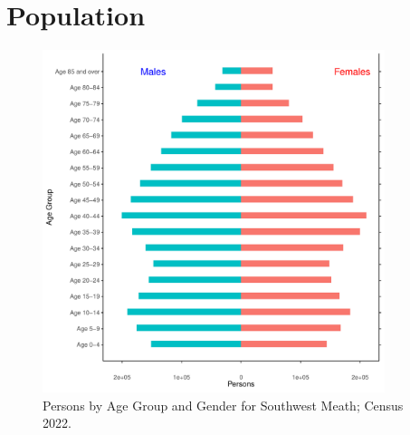 \documentclass{article}
\begin{document}
\pagebreak

\section{Population} 
\label{sect:Pop}

\begin{figure}[h]
	\centering
	\includegraphics[width = 100mm]{../figures/PyramidPlot.pdf}
	\caption{Persons by Age Group and Gender for Southwest Meath; Census 2022.}
	\label{fig:2ae19629-1a6a-13a3-e055-000000000001}
	\end{figure}
\end{document}
